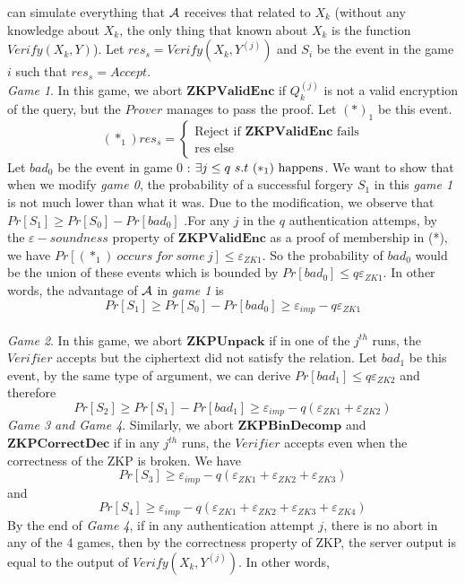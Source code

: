 can simulate everything that $\mathcal{A}$ receives that related to $X_k$
(without any knowledge about $X_k$, the only thing that known about $X_k$ is
the function $Verify(X_k, Y)$). Let $res_s = Verify(X_k, Y^{(j)})$ and $S_i$ be
the event in the game $i$ such that $res_s = Accept$.\\
\textit{Game 1}. In this game, we abort $\mathbf{ZKPValidEnc}$ if $Q_k^{(j)}$
is not a valid encryption of the query, but the $Prover$ manages to pass the
proof. Let $(*)_1$ be this event.
\[
(*_1)res_s = \begin{cases}
\text{Reject if } \mathbf{ZKPValidEnc} \text{ fails}\\
\text{res else}
\end{cases}
\]
Let $bad_0$ be the event in game 0 : $\exists j \leq q\  s.t\  (*_1)\
\textnormal{happens}$. We want to show that when we modify \textit{game 0}, the
probability of a successful forgery $S_1$ in this \textit{game 1} is not much
lower than what it was. Due to the modification, we observe that
$
Pr[S_1] \geq Pr[S_0] - Pr[bad_0]
$
.For any $j$ in the $q$ authentication attemps, by the $\varepsilon-soundness$ property of
$\mathbf{ZKPValidEnc}$ as a proof of membership in (*), we have $Pr[(*_1)\
occurs\ for\ some \ j] \leq \varepsilon_{ZK1}$. So the probability of $bad_0$
would be the union of these events which is bounded by $Pr[bad_0] \leq
q\varepsilon_{ZK1}$. In other words, the advantage of $\mathcal{A}$ in \textit{game
	1} is
\[
Pr[S_1] \geq Pr[S_0] - Pr[bad_0] \geq \varepsilon_{imp} - q\varepsilon_{ZK1}
\]
\\
\textit{Game 2}. In this game, we abort $\mathbf{ZKPUnpack}$ if in one of the
$j^{th}$ runs, the $Verifier$ accepts but the ciphertext did not satisfy the
relation. Let $bad_1$ be this event, by the same type of argument, we can
derive $Pr[bad_1] \leq q\varepsilon_{ZK2}$ and therefore
$$Pr[S_2] \geq Pr[S_1]
- Pr[bad_1] \geq \varepsilon_{imp} - q(\varepsilon_{ZK1}+\varepsilon_{ZK2})
$$
\textit{Game 3 and Game 4}. Similarly, we abort $\mathbf{ZKPBinDecomp}$ and
$\mathbf{ZKPCorrectDec}$ if in any $j^{th}$ runs, the $Verifier$ accepts even
when the correctness of the ZKP is broken. We have
$$Pr[S_3] \geq  \varepsilon_{imp} - q(\varepsilon_{ZK1}+\varepsilon_{ZK2}
+\varepsilon_{ZK3})
$$ and
$$Pr[S_4] \geq  \varepsilon_{imp} - q(\varepsilon_{ZK1}+\varepsilon_{ZK2} +
\varepsilon_{ZK3} + \varepsilon_{ZK4})
$$
By the end of \textit{Game 4}, if in any authentication attempt $j$, there is
no abort in any of the 4 games, then by the correctness property of ZKP, the
server output is equal to the output of $Verify(X_k, Y^{(j)})$. In other words,
